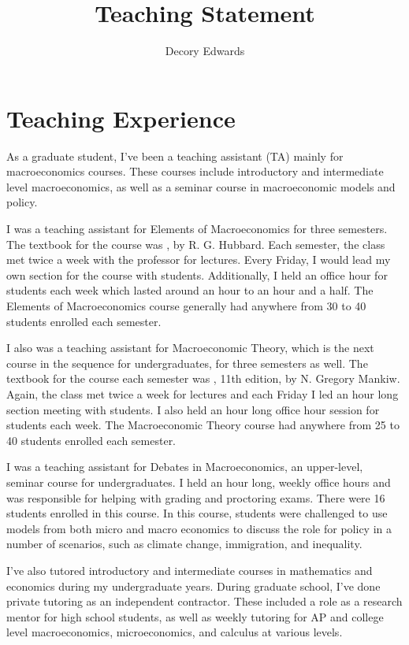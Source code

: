 \documentclass{scrartcl}
\title{Teaching Statement}
\author{Decory Edwards}
\begin{document}
\maketitle

\section{Teaching Experience}

\par As a graduate student, I've been a teaching assistant (TA) mainly for macroeconomics courses. These courses include introductory and intermediate level macroeconomics, as well as a seminar course in macroeconomic models and policy.

\par I was a teaching assistant for Elements of Macroeconomics for three semesters. The textbook for the course was , by R. G. Hubbard. Each semester, the class met twice a week with the professor for lectures. Every Friday, I would lead my own section for the course with students. Additionally, I held an office hour for students each week which lasted around an hour to an hour and a half. The Elements of Macroeconomics course generally had anywhere from 30 to 40 students enrolled each semester.

\par I also was a teaching assistant for Macroeconomic Theory, which is the next course in the sequence for undergraduates, for three semesters as well. The textbook for the course each semester was , 11th edition, by N. Gregory Mankiw. Again, the class met twice a week for lectures and each Friday I led an hour long section meeting with students. I also held an hour long office hour session for students each week. The Macroeconomic Theory course had anywhere from 25 to 40 students enrolled each semester.

\par I was a teaching assistant for Debates in Macroeconomics, an upper-level, seminar course for undergraduates. I held an hour long, weekly office hours and was responsible for helping with grading and proctoring exams. There were 16 students enrolled in this course. In this course, students were challenged to use models from both micro and macro economics to discuss the role for policy in a number of scenarios, such as climate change, immigration, and inequality. 

\par I've also tutored introductory and intermediate courses in mathematics and economics during my undergraduate years. During graduate school, I've done private tutoring as an independent contractor. These included a role as a research mentor for high school students, as well as weekly tutoring for AP and college level macroeconomics, microeconomics, and calculus at various levels.
\end{document}
